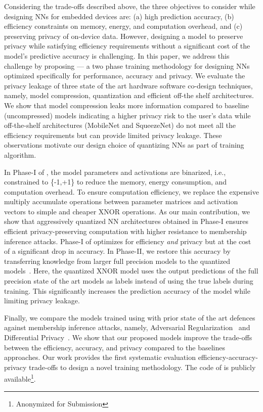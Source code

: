 Considering the trade-offs described above, the three objectives to consider while designing NNs for embedded devices are: (a) high prediction accuracy, (b) efficiency constraints on memory, energy, and computation overhead, and (c) preserving privacy of on-device data.
However, designing a model to preserve privacy while satisfying efficiency requirements without a significant cost of the model’s predictive accuracy is challenging.
In this paper, we address this challenge by proposing \method\hspace{0.02in} — a two phase training methodology for designing NNs optimized specifically for performance, accuracy and privacy.
We evaluate the privacy leakage of three state of the art hardware software co-design techniques, namely, model compression, quantization and efficient off-the shelf architectures.
We show that model compression leaks more information compared to baseline (uncompressed) models indicating a higher privacy risk to the user’s data while off-the-shelf architectures (MobileNet and SqueezeNet) do not meet all the efficiency requirements but can provide limited privacy leakage.
These observations motivate our design choice of quantizing NNs as part of \method\hspace{0.02in} training algorithm.


In Phase-I of \method, the model parameters and activations are binarized, i.e., constrained to \{-1,+1\} to reduce the memory, energy consumption, and computation overhead.
To ensure computation efficiency, we replace the expensive multiply accumulate operations between parameter matrices and activation vectors to simple and cheaper XNOR operations.
As our main contribution, we show that aggressively quantized NN architectures obtained in Phase-I ensures efficient privacy-preserving computation with higher resistance to membership inference attacks.
Phase-I of \method\hspace{0.02in} optimizes for efficiency \textit{and} privacy but at the cost of a significant drop in accuracy.
In Phase-II, we restore this accuracy by transferring knowledge from larger full precision models to the quantized models~\cite{44873}.
Here, the quantized XNOR model uses the output predictions of the full precision state of the art models as labels instead of using the true labels during training.
This significantly increases the prediction accuracy of the model while limiting privacy leakage.


Finally, we compare the models trained using \method\hspace{0.02in} with prior state of the art defences against membership inference attacks, namely, Adversarial Regularization~\cite{DBLP:conf/ccs/NasrSH18} and Differential Privacy~\cite{Abadi:2016:DLD:2976749.2978318}.
We show that our proposed models improve the trade-offs between the efficiency, accuracy, and privacy compared to the baselines approaches.
Our work provides the first systematic evaluation efficiency-accuracy-privacy trade-offs to design a novel training methodology.
The code of \method is publicly available\footnote{Anonymized for Submission}.

